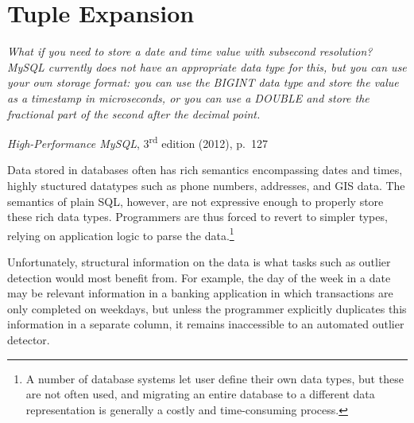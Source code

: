 \section{Tuple Expansion}
\label{sec:expansion}

\vspace{0.1in}

\noindent
\begin{minipage}{\linewidth}
  \begin{minipage}{0.8\linewidth}
    \itshape
    What if you need to store a date and time value with subsecond resolution? MySQL
    currently does not have an appropriate data type for this, but you can use your own
    storage format: you can use the BIGINT data type and store the value as a timestamp in
    microseconds, or you can use a DOUBLE and store the fractional part of the second after
    the decimal point.
  \end{minipage}
  \begin{flushright}
    \textit{High-Performance MySQL}, 3\textsuperscript{rd} edition (2012), p.~127
  \end{flushright}
\end{minipage}\vspace{\figurepadding}

Data stored in databases often has rich semantics encompassing dates and times, highly stuctured datatypes such as phone numbers, addresses, and GIS data. The semantics of plain SQL, however, are not expressive enough to properly store these rich data types. Programmers are thus forced to revert to simpler types, relying on application logic to parse the data.\footnote{A number of database systems let user define their own data types, but these are not often used, and migrating an entire database to a different data representation is generally a costly and time-consuming process.}

Unfortunately, structural information on the data is what tasks such as outlier detection would most benefit from. For example, the day of the week in a date may be relevant information in a banking application in which transactions are only completed on weekdays, but unless the programmer explicitly duplicates this information in a separate column, it remains inaccessible to an automated outlier detector.


